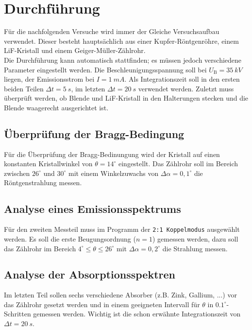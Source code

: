 \section{Durchführung}
\label{sec:Durchführung}
Für die nachfolgenden Versuche wird immer der Gleiche Versuchsaufbau verwendet. Dieser
besteht hauptsächlich aus einer Kupfer-Röntgenröhre, einem LiF-Kristall und einem
Geiger-Müller-Zählrohr.
\\
Die Durchführung kann automatisch stattfinden; es müssen jedoch verschiedene Parameter
eingestellt werden. Die Beschleunigungsspannung soll bei $U_\text{B}=\SI{35}{kV}$ liegen,
der Emissionsstrom bei $I = \SI{1}{mA}$. Als Integrationszeit soll in den ersten beiden
Teilen  $\Delta t = \SI{5}{s}$, im letzten $\Delta t = \SI{20}{s}$ verwendet werden. 
Zuletzt muss überprüft werden, ob Blende und LiF-Kristall in
den Halterungen stecken und die Blende waagerecht ausgerichtet ist.

\subsection{Überprüfung der Bragg-Bedingung}
\label{sec:Überprüfung der Bragg-Bedingung}
Für die Überprüfung der Bragg-Bedinungung wird der Kristall auf einen konstanten
Kristallwinkel von $\theta = 14^\circ$ eingestellt. Das Zählrohr soll im Bereich zwischen
$26^\circ$ und $30^\circ$ mit einem Winkelzuwachs von $\Delta \alpha = 0,1^\circ$ die
Röntgenstrahlung messen.

\subsection{Analyse eines Emissionsspektrums}
\label{sec:Analyse eines Emissionsspektrums}
Für den zweiten Messteil muss im Programm der \texttt{2:1 Koppelmodus} ausgewählt werden.
Es soll die erste Beugungsordnung ($n=1$) gemessen werden, dazu soll das Zählrohr im
Bereich $4^\circ \leq \theta \leq 26^\circ$ mit $\Delta \alpha = 0,2^\circ$ die Strahlung
messen.

\subsection{Analyse der Absorptionsspektren}
\label{sec:Analyse der Absorptionsspektren}
Im letzten Teil sollen sechs verschiedene Absorber (z.B. Zink, Gallium, ...) vor das
Zählrohr gesetzt werden und in einem geeigneten Intervall für $\theta$ in
$0.1^\circ$-Schritten gemessen werden. Wichtig ist die schon erwähnte Integrationszeit von
$\Delta t = \SI{20}{s}$.

